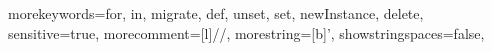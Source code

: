 {morekeywords={for, in, migrate, def, unset, set, newInstance, delete},
sensitive=true,
morecomment=[l]{//},
morestring=[b]',
showstringspaces=false,
}